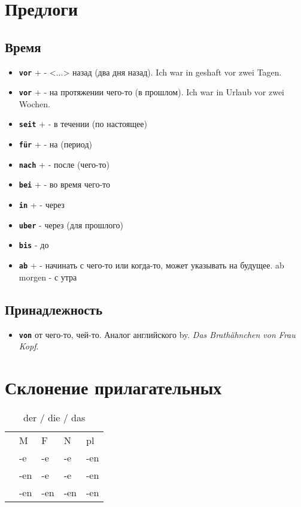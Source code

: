 \documentclass[12pt,a4paper]{report}
\newcommand{\term}[1]{\texttt{\textbf{#1}}}
\newcommand{\ubersatze}[1]{\textit{#1}}
\newcommand{\nom}{ {\color{black}{\textbf{N}}} }
\newcommand{\akk}{ {\color{red}{\textbf{A}}} }
\newcommand{\dat}{ {\color{blue}{\textbf{D}}} }
\begin{document}
\chapter{Предлоги}
\section{Время}
\begin{itemize}
 \item \term{vor} + \dat - <...> назад (два дня назад). Ich war in geshaft vor zwei Tagen.
 \item \term{vor} + \dat - на протяжении чего-то (в прошлом). Ich war in Urlaub vor zwei Wochen.
 \item \term{seit} + \dat - в течении (по настоящее)
 \item \term{für} + \akk - на (период)
 \item \term{nach} + \dat - после (чего-то)
 \item \term{bei} + \dat - во время чего-то
 \item \term{in} + \dat - через
 \item \term{uber} - через (для прошлого)
 \item \term{bis} - до 
 \item \term{ab} + \dat - начинать с чего-то или когда-то, может указывать на будущее. ab morgen - с утра
\end{itemize}

\section{Принадлежность}
\begin{itemize}
\item \term{von} от чего-то, чей-то. Аналог английского by. \ubersatze{Das Brathähnchen von Frau Kopf}.
\end{itemize}

\chapter{Склонение прилагательных}

\begin{longtable}{ c l l l l }
\caption{der / die / das} \label{tab:long} \\
		& M 	& F 	& N 	& pl 	\\
\nom 	& -e 	& -e	&	-e	& -en	\\
\akk 	& -en 	& -e	&	-e	& -en	\\
\dat 	& -en 	& -en	&	-en	& -en	\\
\end{longtable}
\end{document}

